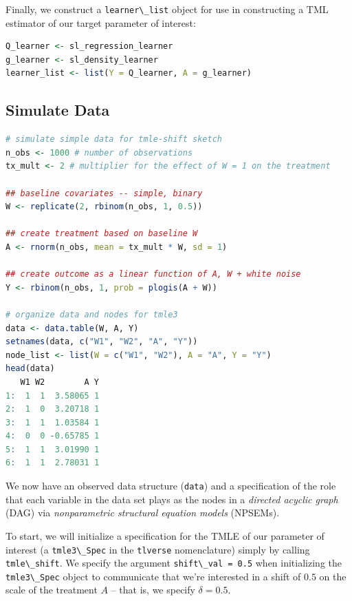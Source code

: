 \documentclass[
  12pt, krantz2,
]{book}
\newcommand{\passthrough}[1]{#1}
\theoremstyle{definition}
\theoremstyle{definition}
\theoremstyle{definition}
\newcommand{\1}{\mathbbm{1}}
\begin{document}
Finally, we construct a \passthrough{\lstinline!learner\_list!} object for use in constructing a TML
estimator of our target parameter of interest:

\begin{lstlisting}[language=R]
Q_learner <- sl_regression_learner
g_learner <- sl_density_learner
learner_list <- list(Y = Q_learner, A = g_learner)
\end{lstlisting}

\hypertarget{simulate-data-1}{%
\subsection{Simulate Data}\label{simulate-data-1}}

\begin{lstlisting}[language=R]
# simulate simple data for tmle-shift sketch
n_obs <- 1000 # number of observations
tx_mult <- 2 # multiplier for the effect of W = 1 on the treatment

## baseline covariates -- simple, binary
W <- replicate(2, rbinom(n_obs, 1, 0.5))

## create treatment based on baseline W
A <- rnorm(n_obs, mean = tx_mult * W, sd = 1)

## create outcome as a linear function of A, W + white noise
Y <- rbinom(n_obs, 1, prob = plogis(A + W))

# organize data and nodes for tmle3
data <- data.table(W, A, Y)
setnames(data, c("W1", "W2", "A", "Y"))
node_list <- list(W = c("W1", "W2"), A = "A", Y = "Y")
head(data)
   W1 W2        A Y
1:  1  1  3.58065 1
2:  1  0  3.20718 1
3:  1  1  1.03584 1
4:  0  0 -0.65785 1
5:  1  1  3.01990 1
6:  1  1  2.78031 1
\end{lstlisting}

We now have an observed data structure (\passthrough{\lstinline!data!}) and a specification of the role
that each variable in the data set plays as the nodes in a \emph{directed acyclic
graph} (DAG) via \emph{nonparametric structural equation models} (NPSEMs).

To start, we will initialize a specification for the TMLE of our parameter of
interest (a \passthrough{\lstinline!tmle3\_Spec!} in the \passthrough{\lstinline!tlverse!} nomenclature) simply by calling
\passthrough{\lstinline!tmle\_shift!}. We specify the argument \passthrough{\lstinline!shift\_val = 0.5!} when initializing the
\passthrough{\lstinline!tmle3\_Spec!} object to communicate that we're interested in a shift of \(0.5\) on
the scale of the treatment \(A\) -- that is, we specify \(\delta = 0.5\).
\end{document}
